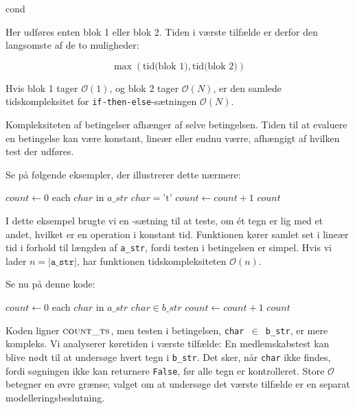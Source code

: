 \begin{codebox}
    \li \If cond \Then
    \li     {}
    \li \Else
    \li     {}
    \li \End
\end{codebox}


Her udføres enten blok 1 eller blok 2. Tiden i værste tilfælde er derfor den langsomste af de to muligheder:

\[
\max (\text{tid(blok 1)}, \text{tid(blok 2)})
\]

Hvis blok 1 tager $\mathcal{O}(1)$, og blok 2 tager $\mathcal{O}(N)$, er den samlede tidskompleksitet for \texttt{if-then-else}-sætningen $\mathcal{O}(N)$.

Kompleksiteten af betingelser afhænger af selve betingelsen. Tiden til at evaluere en betingelse kan være konstant, lineær eller endnu værre, afhængigt af hvilken test der udføres.

Se på følgende eksempler, der illustrerer dette nærmere:

\begin{codebox}
    \li $count \gets 0$
    \li \For each $char$ in $a\_str$ \Do
    \li     \If $char = \text{'t'}$ \Then
    \li         $count \gets count + 1$
            \End
        \End
    \li \Return $count$
\end{codebox}


I dette eksempel brugte vi en \texttt{\If}-sætning til at teste, om ét tegn er lig med et andet, hvilket er en operation i konstant tid. Funktionen kører samlet set i lineær tid i forhold til længden af \texttt{a\_str}, fordi testen i betingelsen er simpel. Hvis vi lader $n = |\texttt{a\_str}|$, har funktionen tidskompleksiteten $\mathcal{O}(n)$.

Se nu på denne kode:

\begin{codebox}
    \li $count \gets 0$
    \li \For each $char$ in $a\_str$ \Do
    \li     \If $char \in b\_str$ \Then
    \li         $count \gets count + 1$
            \End
        \End
    \li \Return $count$
\end{codebox}

Koden ligner $\proc{count\_ts}$, men testen i betingelsen, \texttt{char $\in$ b\_str}, er mere kompleks. Vi analyserer køretiden i værste tilfælde: En medlemskabstest kan blive nødt til at undersøge hvert tegn i \texttt{b\_str}. Det sker, når \texttt{char} ikke findes, fordi søgningen ikke kan returnere \texttt{False}, før alle tegn er kontrolleret. Store $\mathcal{O}$ betegner en øvre grænse; valget om at undersøge det værste tilfælde er en separat modelleringsbeslutning.

